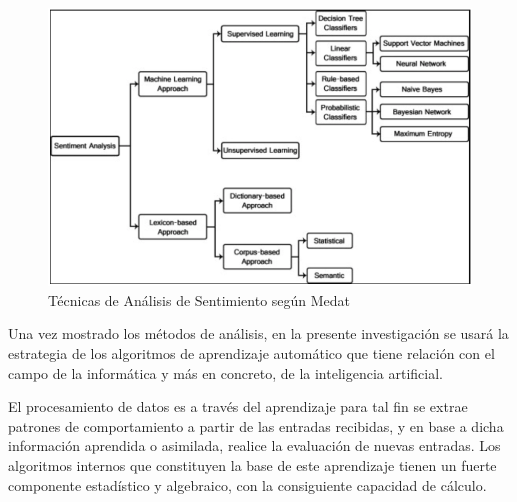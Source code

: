 \begin{figure}[H]
\centering
\includegraphics[scale=0.4]{chapters/img/Ch05_Medhat.PNG}
\caption{Técnicas de An\'alisis de Sentimiento seg\'un Medat}
\end{figure}

Una vez mostrado los m\'etodos de an\'alisis, en la presente investigación se usará la estrategia de los algoritmos de aprendizaje automático que tiene relación con el campo de la informática y más en concreto, de la inteligencia artificial.

 El procesamiento de datos es a trav\'es del aprendizaje para tal fin se extrae patrones de comportamiento a partir de las entradas recibidas, y en base a dicha informaci\'on aprendida o asimilada, realice la evaluaci\'on de nuevas entradas. Los algoritmos internos que constituyen la base de este aprendizaje tienen un fuerte componente estad\'istico y algebraico, con la consiguiente capacidad de c\'alculo.



\cleardoublepage